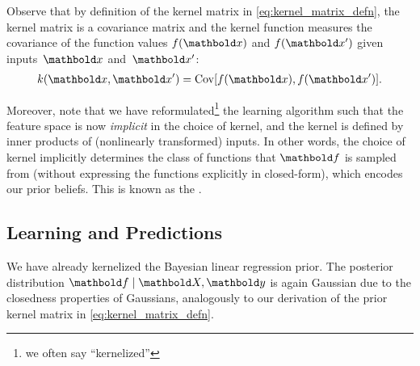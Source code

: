 Observe that by definition of the kernel matrix in \cref{eq:kernel_matrix_defn}, the kernel matrix is a covariance matrix and the kernel function measures the covariance of the function values $f(\vx)$ and $f(\vxp)$ given inputs~$\vx$ and~$\vxp$: \begin{align}
  k(\vx, \vxp) = \Cov{f(\vx), f(\vxp)}.
\end{align}

Moreover, note that we have reformulated\footnote{we often say ``kernelized''} the learning algorithm such that the feature space is now \emph{implicit} in the choice of kernel, and the kernel is defined by inner products of (nonlinearly transformed) inputs.
In other words, the choice of kernel implicitly determines the class of functions that $\vf$ is sampled from (without expressing the functions explicitly in closed-form), which encodes our prior beliefs.
This is known as the .

\subsection{Learning and Predictions}\label{sec:blr:learning_and_inference}

We have already kernelized the Bayesian linear regression prior.
The posterior distribution $\vf \mid \mX, \vy$ is again Gaussian due to the closedness properties of Gaussians, analogously to our derivation of the prior kernel matrix in \cref{eq:kernel_matrix_defn}.

